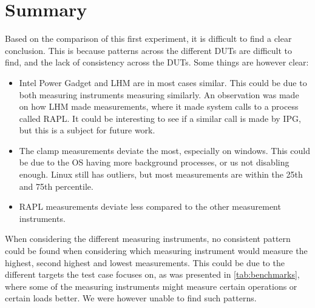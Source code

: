 \section{Summary}

Based on the comparison of this first experiment, it is difficult to find a clear conclusion. This is because patterns across the different DUTs are difficult to find, and the lack of consistency across the DUTs. Some things are however clear:

\begin{itemize}
    \item Intel Power Gadget and LHM are in most cases similar. This could be due to both measuring instruments measuring similarly. An observation was made on how LHM made measurements, where it made system calls to a process called RAPL. It could be interesting to see if a similar call is made by IPG, but this is a subject for future work.
    \item The clamp measurements deviate the most, especially on windows. This could be due to the OS having more background processes, or us not disabling enough. Linux still has outliers, but most measurements are within the 25th and 75th percentile.
    \item RAPL measurements deviate less compared to the other measurement instruments.
\end{itemize}

When considering the different measuring instruments, no consistent pattern could be found when considering which measuring instrument would measure the highest, second highest and lowest measurements. This could be due to the different targets the test case focuses on, as was presented in \cref{tab:benchmarks}, where some of the measuring instruments might measure certain operations or certain loads better. We were however unable to find such patterns.

